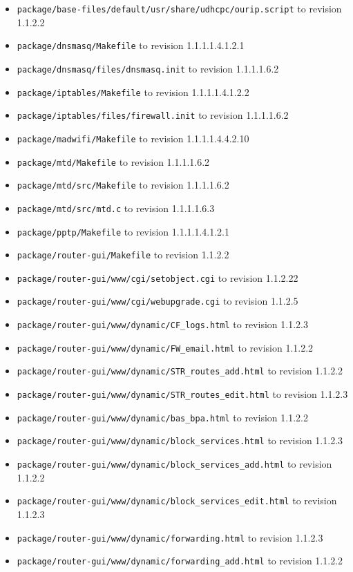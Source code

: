 \documentclass[12pt]{report}
\begin{document}
\begin{itemize}
\begin{enumerate}
\begin{itemize}
	\item \texttt{package/base-files/default/usr/share/udhcpc/ourip.script} to revision 1.1.2.2
	\item \texttt{package/dnsmasq/Makefile} to revision 1.1.1.1.4.1.2.1
	\item \texttt{package/dnsmasq/files/dnsmasq.init} to revision 1.1.1.1.6.2
	\item \texttt{package/iptables/Makefile} to revision 1.1.1.1.4.1.2.2
	\item \texttt{package/iptables/files/firewall.init} to revision 1.1.1.1.6.2
	\item \texttt{package/madwifi/Makefile} to revision 1.1.1.1.4.4.2.10
	\item \texttt{package/mtd/Makefile} to revision 1.1.1.1.6.2
	\item \texttt{package/mtd/src/Makefile} to revision 1.1.1.1.6.2
	\item \texttt{package/mtd/src/mtd.c} to revision 1.1.1.1.6.3
	\item \texttt{package/pptp/Makefile} to revision 1.1.1.1.4.1.2.1
	\item \texttt{package/router-gui/Makefile} to revision 1.1.2.2
	\item \texttt{package/router-gui/www/cgi/setobject.cgi} to revision 1.1.2.22
	\item \texttt{package/router-gui/www/cgi/webupgrade.cgi} to revision 1.1.2.5
	\item \texttt{package/router-gui/www/dynamic/CF\_logs.html} to revision 1.1.2.3
	\item \texttt{package/router-gui/www/dynamic/FW\_email.html} to revision 1.1.2.2
	\item \texttt{package/router-gui/www/dynamic/STR\_routes\_add.html} to revision 1.1.2.2
	\item \texttt{package/router-gui/www/dynamic/STR\_routes\_edit.html} to revision 1.1.2.3
	\item \texttt{package/router-gui/www/dynamic/bas\_bpa.html} to revision 1.1.2.2
	\item \texttt{package/router-gui/www/dynamic/block\_services.html} to revision 1.1.2.3
	\item \texttt{package/router-gui/www/dynamic/block\_services\_add.html} to revision 1.1.2.2
	\item \texttt{package/router-gui/www/dynamic/block\_services\_edit.html} to revision 1.1.2.3
	\item \texttt{package/router-gui/www/dynamic/forwarding.html} to revision 1.1.2.3
	\item \texttt{package/router-gui/www/dynamic/forwarding\_add.html} to revision 1.1.2.2

\end{itemize}
\end{enumerate}
\end{itemize}
\end{document}
